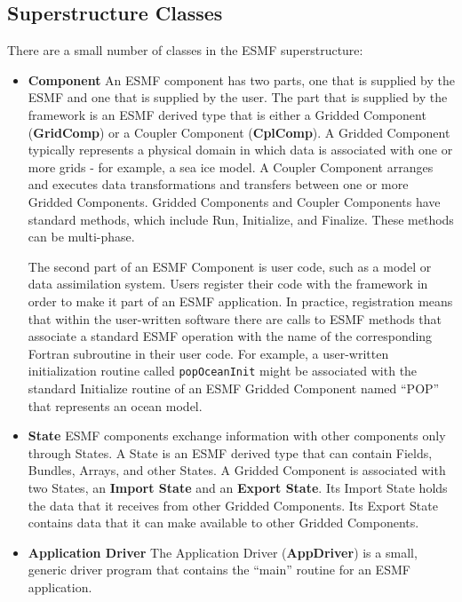 \subsection{Superstructure Classes}

There are a small number of classes in the ESMF superstructure:

\begin{itemize}
\item {\bf Component}  An ESMF component has two parts, one that is 
supplied by the ESMF and one that is supplied by the user.  The
part that is supplied by the framework is an ESMF derived type that
is either a Gridded Component ({\bf GridComp}) or a Coupler 
Component ({\bf CplComp}).  A Gridded Component typically represents
a physical domain in which data is associated with one or more 
grids - for example, a sea ice model.  A Coupler Component 
arranges and executes data transformations and transfers between 
one or more Gridded Components. Gridded Components and Coupler 
Components have standard methods, which include Run, Initialize,
and Finalize.  These methods can be multi-phase.

The second part of an ESMF Component is user code, such as a
model or data assimilation system.  Users register their code with 
the framework in order to make it part of an ESMF application.  
In practice, registration means that within the user-written 
software there are calls to ESMF methods that associate a 
standard ESMF operation with the name of the corresponding 
Fortran subroutine in their user code.  For example, a user-written
initialization routine called {\tt popOceanInit} might be 
associated with the standard Initialize routine of an ESMF 
Gridded Component named ``POP'' that represents an ocean model.

\item {\bf State}  ESMF components exchange information with other 
components only through States.  A State is an ESMF derived
type that can contain Fields, Bundles, Arrays, and other
States.  A Gridded Component  is associated with two States, an 
{\bf Import State} and an {\bf Export State}.  Its Import State 
holds the data that it receives from other Gridded Components.  
Its Export State contains data that it can make available to 
other Gridded Components. 

\item {\bf Application Driver} The Application Driver ({\bf AppDriver}) 
is a small, generic driver program that contains the ``main'' 
routine for an ESMF application.

\end{itemize}


